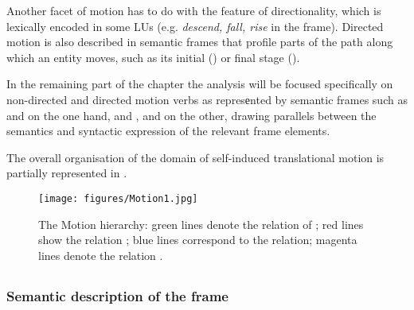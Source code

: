 \documentclass[output=paper,colorlinks,citecolor=brown]{langscibook}
\begin{document}
Another facet of motion has to do with the feature of directionality, which is lexically encoded in some LUs (e.g. \textit{descend, fall, rise} in the  frame). Directed motion is also described in semantic frames that profile parts of the path along which an entity moves, such as its initial () or final stage (). 

In the remaining part of the chapter the analysis will be focused specifically on non-directed and directed motion verbs as represеnted by semantic frames such as  and  on the one hand, and ,  and  on the other, drawing parallels between the semantics and syntactic expression of the relevant frame elements.

The overall organisation of the domain of self-induced translational motion is partially represented in .

\begin{figure}
\texttt{[image: figures/Motion1.jpg]}
\caption{The Motion hierarchy: green lines denote the relation of ; red lines show the relation ; blue lines correspond to the  relation; magenta lines denote the relation .}\label{ch4:fig:01}
\end{figure} 


\subsection{}

\subsubsection{Semantic description of the  frame}

\end{document}
